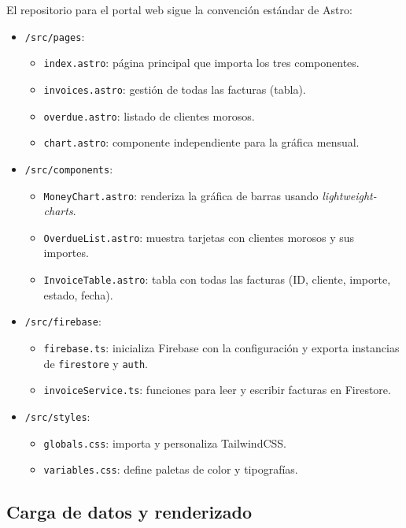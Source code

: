 \begin{large}

El repositorio para el portal web sigue la convención estándar de Astro:
\begin{itemize}
  \item \texttt{/src/pages}:
    \begin{itemize}
      \item \texttt{index.astro}: página principal que importa los tres componentes.
      \item \texttt{invoices.astro}: gestión de todas las facturas (tabla).
      \item \texttt{overdue.astro}: listado de clientes morosos.
      \item \texttt{chart.astro}: componente independiente para la gráfica mensual.
    \end{itemize}
  \item \texttt{/src/components}:
    \begin{itemize}
      \item \texttt{MoneyChart.astro}: renderiza la gráfica de barras usando \emph{lightweight-charts}.
      \item \texttt{OverdueList.astro}: muestra tarjetas con clientes morosos y sus importes.
      \item \texttt{InvoiceTable.astro}: tabla con todas las facturas (ID, cliente, importe, estado, fecha).
    \end{itemize}
  \item \texttt{/src/firebase}:
    \begin{itemize}
      \item \texttt{firebase.ts}: inicializa Firebase con la configuración y exporta instancias de \texttt{firestore} y \texttt{auth}.
      \item \texttt{invoiceService.ts}: funciones para leer y escribir facturas en Firestore.
    \end{itemize}
  \item \texttt{/src/styles}:
    \begin{itemize}
      \item \texttt{globals.css}: importa y personaliza TailwindCSS.
      \item \texttt{variables.css}: define paletas de color y tipografías.
    \end{itemize}
\end{itemize}

\end{large}

\subsection{Carga de datos y renderizado}

